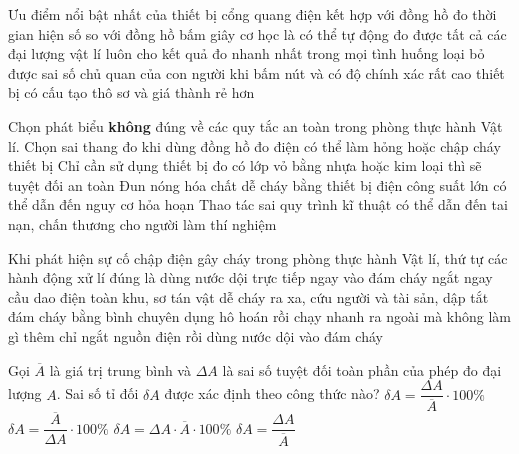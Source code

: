 \begin{ex}
	Ưu điểm nổi bật nhất của thiết bị cổng quang điện kết hợp với đồng hồ đo thời gian hiện số so với đồng hồ bấm giây cơ học là
	\choice
	{có thể tự động đo được tất cả các đại lượng vật lí}
	{luôn cho kết quả đo nhanh nhất trong mọi tình huống}
	{\True loại bỏ được sai số chủ quan của con người khi bấm nút và có độ chính xác rất cao}
	{thiết bị có cấu tạo thô sơ và giá thành rẻ hơn}
\end{ex}

\begin{ex}
	Chọn phát biểu \textbf{không} đúng về các quy tắc an toàn trong phòng thực hành Vật lí.
	\choice
	{Chọn sai thang đo khi dùng đồng hồ đo điện có thể làm hỏng hoặc chập cháy thiết bị}
	{\True Chỉ cần sử dụng thiết bị đo có lớp vỏ bằng nhựa hoặc kim loại thì sẽ tuyệt đối an toàn}
	{Đun nóng hóa chất dễ cháy bằng thiết bị điện công suất lớn có thể dẫn đến nguy cơ hỏa hoạn}
	{Thao tác sai quy trình kĩ thuật có thể dẫn đến tai nạn, chấn thương cho người làm thí nghiệm}
\end{ex}

\begin{ex}
	Khi phát hiện sự cố chập điện gây cháy trong phòng thực hành Vật lí, thứ tự các hành động xử lí đúng là
	\choice
	{dùng nước dội trực tiếp ngay vào đám cháy}
	{\True ngắt ngay cầu dao điện toàn khu, sơ tán vật dễ cháy ra xa, cứu người và tài sản, dập tắt đám cháy bằng bình chuyên dụng}
	{hô hoán rồi chạy nhanh ra ngoài mà không làm gì thêm}
	{chỉ ngắt nguồn điện rồi dùng nước dội vào đám cháy}
\end{ex}

\begin{ex}
	Gọi $\overline{A}$ là giá trị trung bình và $\Delta A$ là sai số tuyệt đối toàn phần của phép đo đại lượng $A$. Sai số tỉ đối $\delta A$ được xác định theo công thức nào?
	\choice
	{\True $\delta A = \dfrac{\Delta A}{\overline{A}} \cdot 100\%$}
	{$\delta A = \dfrac{\overline{A}}{\Delta A} \cdot 100\%$}
	{$\delta A = \Delta A \cdot \overline{A} \cdot 100\%$}
	{$\delta A = \dfrac{\Delta A}{\overline{A}}$}
\end{ex}

